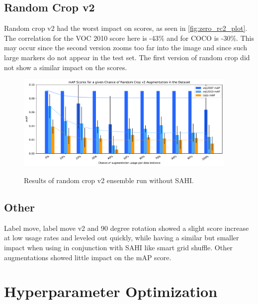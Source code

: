 \documentclass[10pt]{book}
\newcommand{\figureref}[1]{\autoref{#1}}
\begin{document}

\subsection{Random Crop v2}

Random crop v2 had the worst impact on scores, as seen in \figureref{fig:zero_rc2_plot}. The correlation for the VOC 2010 score here is -43\% and for \ac{COCO} is -30\%. This may occur since the second version zooms too far into the image and since such large markers do not appear in the test set. The first version of random crop did not show a similar impact on the scores.

\begin{figure}
  \caption{Results of random crop v2 ensemble run without \ac{SAHI}.}
  \includegraphics[width=0.95\textwidth]{image/zero-based-rc2-ensemble-2-thesis-2}
  \label{fig:zero_rc2_plot}
\end{figure}

\subsection{Other} %

Label move, label move v2 and 90 degree rotation showed a slight score increase at low usage rates and leveled out quickly, while having a similar but smaller impact when using in conjunction with \ac{SAHI} like smart grid shuffle. Other augmentations showed little impact on the \ac{mAP} score.

\section{Hyperparameter Optimization}
\end{document}
